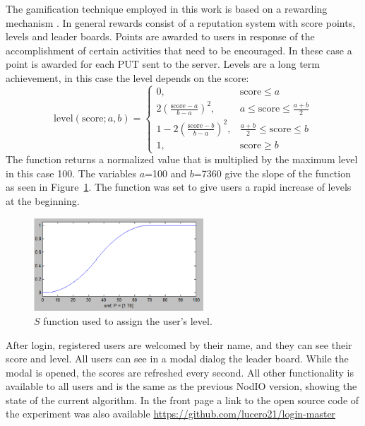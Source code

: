 \documentclass{llncs}
\begin{document}
The gamification technique employed in this work is based on a rewarding mechanism  
\cite{dubois2013understanding}. In general rewards  consist of a reputation system 
with score points, levels and leader boards. Points are awarded to users in response of 
the accomplishment of certain activities that need to be encouraged. In these case
a point is awarded for each PUT sent to the server. Levels are a long
term achievement, in this case the level depends on the score:
\[ \text{level}(\text{score};a,b)= 
    \begin{cases} 
      0,                                    &  \text{score}\leq a\\    
      2(\frac{\text{score}-a}{b-a})^{2},    &  a\leq \text{score}\leq \frac{a+b}{2}\\
      1-2(\frac{\text{score}-b}{b-a})^{2},  & \frac{a+b}{2} \leq \text{score}\leq b\\
      1,                                    & \text{score}\geq b 
   \end{cases}
\]
The function returns a normalized value that is multiplied by the maximum level 
in this case 100. The variables $a$=100 and $b$=7360 give the slope of the function as
seen in Figure~\ref{fig:s}. The function was set to give users a rapid increase of 
levels at the beginning.
\begin{figure}[t]
    \centering
        \includegraphics[width=2.5in]{img/s.png}
    \caption{$S$ function used to assign the user's level.
    }
    \label{fig:s}
\end{figure}

After login, registered users are welcomed by their name, and they can see
their score and level. All users can see in a modal dialog the leader board.
While the modal is opened, the scores are refreshed every second. All other 
functionality is available to all users and is the same as the previous 
{\sf NodIO} version, showing the state of the current algorithm. 
In the front page a link to the open source code of the experiment was also 
available \url{https://github.com/lucero21/login-master} 
\end{document}
